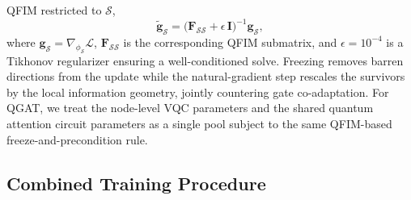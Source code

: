 \documentclass[journal]{IEEEtran}
\begin{document}
QFIM restricted to $\mathcal{S}$,
\begin{equation}
  \tilde{\mathbf{g}}_{\mathcal{S}} =
  \bigl(\mathbf{F}_{\mathcal{S}\mathcal{S}} + \epsilon\,\mathbf{I}\bigr)^{-1}
  \mathbf{g}_{\mathcal{S}},
  \label{eq:sp_anneal}
\end{equation}
where $\mathbf{g}_{\mathcal{S}} = \nabla_{\phi_{\mathcal{S}}}\mathcal{L}$,
$\mathbf{F}_{\mathcal{S}\mathcal{S}}$ is the corresponding QFIM submatrix,
and $\epsilon = 10^{-4}$ is a Tikhonov regularizer ensuring a
well-conditioned solve. Freezing removes barren directions from the update
while the natural-gradient step rescales the survivors by the local
information geometry, jointly countering gate co-adaptation. For QGAT, we
treat the node-level VQC parameters and the shared quantum attention
circuit parameters as a single pool subject to the same QFIM-based
freeze-and-precondition rule.



\subsection{Combined Training Procedure}
\end{document}
